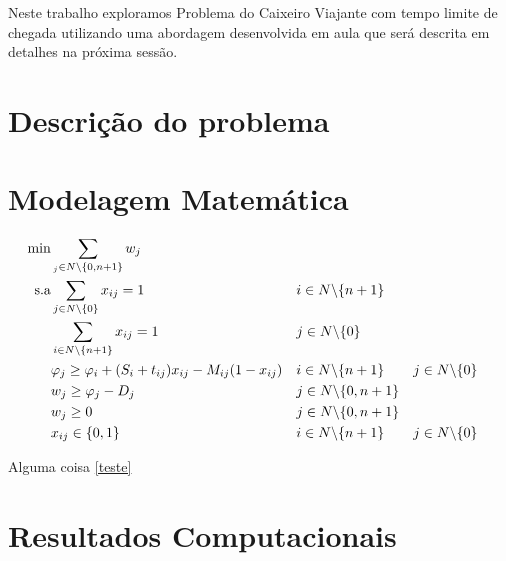 \documentclass[12pt]{article}
\begin{document}
Neste trabalho exploramos Problema do Caixeiro Viajante com tempo limite de chegada utilizando uma abordagem desenvolvida em aula que será descrita em detalhes na próxima sessão.



\section{Descrição do problema}



\section{Modelagem Matemática}

\begin{align}
  \min       & \sum_{_j\in N\backslash \{0,n+1\}} w_j                             & \label{teste}                                                          \\
  \hbox{s.a} & \sum_{j\in N\backslash \{0\}} x_{ij} = 1                           &               & i\in N\backslash \{n+1\}                               \\
             & \sum_{i\in N\backslash \{n+1\}} x_{ij} = 1                         &               & j\in N\backslash \{0\}                                 \\
             & \varphi_j \geq \varphi_i + (S_i + t_{ij})x_{ij} - M_{ij}(1-x_{ij}) &               & i\in N\backslash \{n+1\}   &  & j\in N\backslash \{0\} \\
             & w_j \geq \varphi_j - D_j                                           &               & j\in N\backslash \{0,n+1\}                             \\
             & w_j \geq 0                                                         &               & j\in N\backslash \{0,n+1\}                             \\
             & x_{ij} \in \{0,1\}                                                 &               & i\in N\backslash \{n+1\}   &  & j\in N\backslash \{0\}
\end{align}

Alguma coisa \eqref{teste}

\section{Resultados Computacionais}
\end{document}

